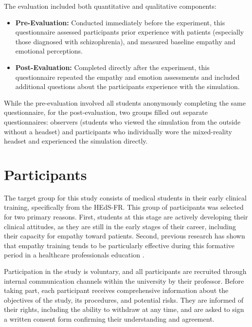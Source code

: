 \vspace{1em}

The evaluation included both quantitative and qualitative components:

\begin{itemize}
  \item \textbf{Pre-Evaluation:} Conducted immediately before the experiment, this questionnaire assessed participants prior experience with patients (especially those diagnosed with schizophrenia), and measured baseline empathy and emotional perceptions.
  \item \textbf{Post-Evaluation:} Completed directly after the experiment, this questionnaire repeated the empathy and emotion assessments and included additional questions about the participants experience with the simulation.
\end{itemize}

While the pre-evaluation involved all students anonymously completing the same questionnaire, for the post-evaluation, two groups filled out separate questionnaires: observers (students who viewed the simulation from the outside without a headset) and participants who individually wore the mixed-reality headset and experienced the simulation directly.


\section{Participants}

The target group for this study consists of medical students in their early clinical training, specifically from the HEdS-FR. This group of participants was selected for two primary reasons. First, students at this stage are actively developing their clinical attitudes, as they are still in the early stages of their career, including their capacity for empathy toward patients. Second, previous research has shown that empathy training tends to be particularly effective during this formative period in a healthcare professionals education \cite{Hsia2022, Kuhail2022}.

\vspace{1em}

Participation in the study is voluntary, and all participants are recruited through internal communication channels within the university by their professor. Before taking part, each participant receives comprehensive information about the objectives of the study, its procedures, and potential risks. They are informed of their rights, including the ability to withdraw at any time, and are asked to sign a written consent form confirming their understanding and agreement.


